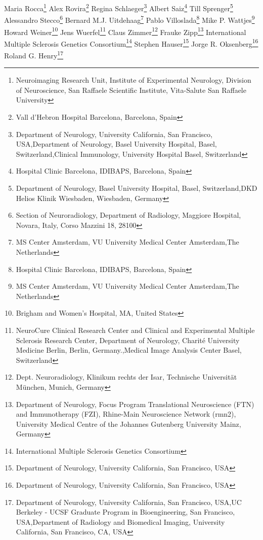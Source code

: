 Maria Rocca\footnote[14]{Neuroimaging Research Unit, Institute of Experimental Neurology, Division of Neuroscience, San Raffaele Scientific Institute, Vita-Salute San Raffaele University}
Alex Rovira\footnote[10]{Vall d’Hebron Hospital Barcelona, Barcelona, Spain}
Regina Schlaeger\footnote[1,6,8]{Department of Neurology, University California, San Francisco,  USA,Department of Neurology, Basel University Hospital, Basel, Switzerland,Clinical Immunology, University Hospital Basel, Switzerland}
Albert Saiz\footnote[21]{Hospital Clinic Barcelona, IDIBAPS, Barcelona, Spain}
Till Sprenger\footnote[6,25]{Department of Neurology, Basel University Hospital, Basel, Switzerland,DKD Helios Klinik Wiesbaden, Wiesbaden, Germany}
Alessandro Stecco\footnote[26]{Section of Neuroradiology, Department of Radiology, Maggiore Hospital, Novara, Italy, Corso Mazzini 18, 28100}
Bernard M.J. Uitdehaag\footnote[27]{MS Center Amsterdam, VU University Medical Center Amsterdam,The Netherlands}
Pablo Villoslada\footnote[21]{Hospital Clinic Barcelona, IDIBAPS, Barcelona, Spain}
Mike P. Wattjes\footnote[27]{MS Center Amsterdam, VU University Medical Center Amsterdam,The Netherlands}
Howard Weiner\footnote[7]{Brigham and Women's Hospital, MA, United States}
Jens Wuerfel\footnote[3,28]{NeuroCure Clinical Research Center and Clinical and Experimental Multiple Sclerosis Research Center, Department of Neurology, Charité University Medicine Berlin, Berlin, Germany.,Medical Image Analysis Center Basel, Switzerland}
Claus Zimmer\footnote[29]{Dept. Neuroradiology, Klinikum rechts der Isar, Technische Universität München, Munich, Germany}
Frauke Zipp\footnote[17]{Department of Neurology, Focus Program Translational Neuroscience (FTN) and Immunotherapy (FZI), Rhine-Main Neuroscience Network (rmn2), University Medical Centre of the Johannes Gutenberg University Mainz, Germany}
International Multiple Sclerosis Genetics Consortium\footnote[30]{International Multiple Sclerosis Genetics Consortium}
Stephen Hauser\footnote[1]{Department of Neurology, University California, San Francisco,  USA}
Jorge R. Oksenberg\footnote[1]{Department of Neurology, University California, San Francisco,  USA}
Roland G. Henry\footnote[1,2,11]{Department of Neurology, University California, San Francisco,  USA,UC Berkeley - UCSF Graduate Program in Bioengineering, San Francisco, USA,Department of Radiology and Biomedical Imaging, University California, San Francisco, CA, USA}

\else %

